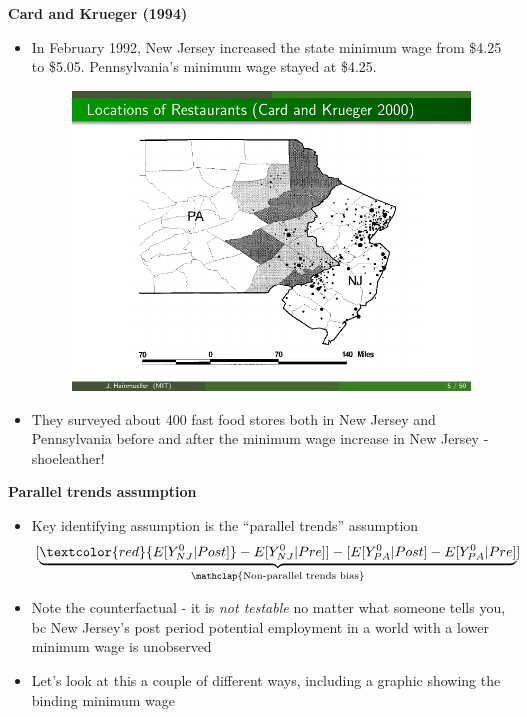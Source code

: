 \documentclass[notes=show]{beamer}
\begin{document}
\begin{frame}[plain]
	\begin{center}
	\textbf{Card and Krueger (1994)}
	\end{center}
	
	\begin{itemize}
	\item In February 1992, New Jersey increased the state minimum wage from \$4.25 to \$5.05.  Pennsylvania's minimum wage stayed at \$4.25.
	
	\begin{figure}
	\includegraphics[scale=0.5]{./lecture_includes/nj.pdf}
	\end{figure}
	
	\item They surveyed about 400 fast food stores both in New Jersey and Pennsylvania before and after the minimum wage increase in New Jersey - shoeleather!
	\end{itemize}

\end{frame}

\begin{frame}[plain]
\begin{center}
\textbf{Parallel trends assumption}
\end{center}

\begin{itemize}
\item Key identifying assumption is the ``parallel trends'' assumption$$[  \underbrace{\textcolor{red}{E[Y^0_{NJ} | Post]} - E[Y^0_{NJ} | Pre]  ] -  [ E[Y^0_{PA} | Post] - E[Y_{PA}^0 | Pre] }_{\mathclap{\text{Non-parallel trends bias}}}  ]$$
\item Note the counterfactual - it is \emph{not testable} no matter what someone tells you, bc New Jersey's post period potential employment in a world with a lower minimum wage is unobserved 
\item Let's look at this a couple of different ways, including a graphic showing the binding minimum wage
\end{itemize}

\end{frame}
\end{document}

